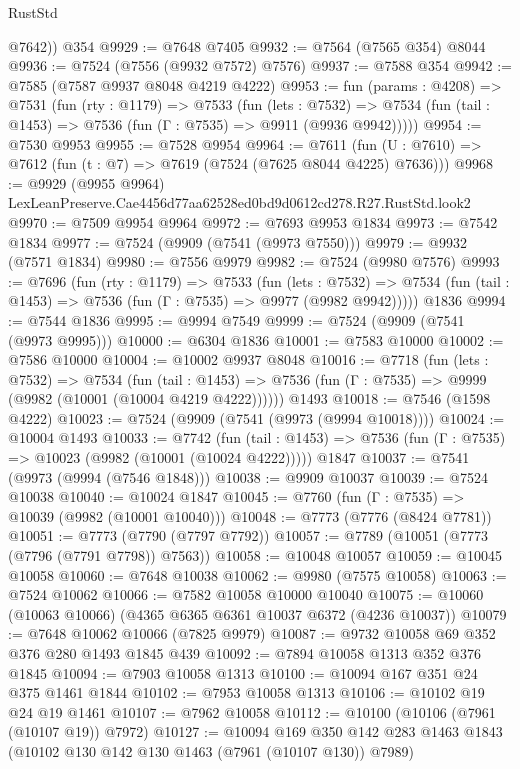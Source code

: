 \begin{lexlean}{RustStd}
\begin{coremodule}
        @7642))
    @354
@9929 := @7648 @7405
@9932 := @7564 (@7565 @354) @8044
@9936 := @7524 (@7556 (@9932 @7572) @7576)
@9937 := @7588 @354
@9942 := @7585 (@7587 @9937 @8048 @4219 @4222)
@9953 := fun (params : @4208) =>
  @7531
    (fun (rty : @1179) =>
    @7533
      (fun (lets : @7532) =>
      @7534 (fun (tail : @1453) => @7536 (fun (Γ : @7535) => @9911 (@9936 @9942)))))
@9954 := @7530 @9953
@9955 := @7528 @9954
@9964 := @7611 (fun (U : @7610) => @7612 (fun (t : @7) => @7619 (@7524 (@7625 @8044 @4225) @7636)))
@9968 := @9929 (@9955 @9964) LexLeanPreserve.Cae4456d77aa62528ed0bd9d0612cd278.R27.RustStd.look2
@9970 := @7509 @9954 @9964
@9972 := @7693 @9953 @1834
@9973 := @7542 @1834
@9977 := @7524 (@9909 (@7541 (@9973 @7550)))
@9979 := @9932 (@7571 @1834)
@9980 := @7556 @9979
@9982 := @7524 (@9980 @7576)
@9993 := @7696
    (fun (rty : @1179) =>
    @7533
      (fun (lets : @7532) =>
      @7534 (fun (tail : @1453) => @7536 (fun (Γ : @7535) => @9977 (@9982 @9942)))))
    @1836
@9994 := @7544 @1836
@9995 := @9994 @7549
@9999 := @7524 (@9909 (@7541 (@9973 @9995)))
@10000 := @6304 @1836
@10001 := @7583 @10000
@10002 := @7586 @10000
@10004 := @10002 @9937 @8048
@10016 := @7718
    (fun (lets : @7532) =>
    @7534
      (fun (tail : @1453) =>
      @7536 (fun (Γ : @7535) => @9999 (@9982 (@10001 (@10004 @4219 @4222))))))
    @1493
@10018 := @7546 (@1598 @4222)
@10023 := @7524 (@9909 (@7541 (@9973 (@9994 @10018))))
@10024 := @10004 @1493
@10033 := @7742
    (fun (tail : @1453) => @7536 (fun (Γ : @7535) => @10023 (@9982 (@10001 (@10024 @4222)))))
    @1847
@10037 := @7541 (@9973 (@9994 (@7546 @1848)))
@10038 := @9909 @10037
@10039 := @7524 @10038
@10040 := @10024 @1847
@10045 := @7760 (fun (Γ : @7535) => @10039 (@9982 (@10001 @10040)))
@10048 := @7773 (@7776 (@8424 @7781))
@10051 := @7773 (@7790 (@7797 @7792))
@10057 := @7789 (@10051 (@7773 (@7796 (@7791 @7798)) @7563))
@10058 := @10048 @10057
@10059 := @10045 @10058
@10060 := @7648 @10038
@10062 := @9980 (@7575 @10058)
@10063 := @7524 @10062
@10066 := @7582 @10058 @10000 @10040
@10075 := @10060 (@10063 @10066) (@4365 @6365 @6361 @10037 @6372 (@4236 @10037))
@10079 := @7648 @10062 @10066 (@7825 @9979)
@10087 := @9732 @10058 @69 @352 @376 @280 @1493 @1845 @439
@10092 := @7894 @10058 @1313 @352 @376 @1845
@10094 := @7903 @10058 @1313
@10100 := @10094 @167 @351 @24 @375 @1461 @1844
@10102 := @7953 @10058 @1313
@10106 := @10102 @19 @24 @19 @1461
@10107 := @7962 @10058
@10112 := @10100 (@10106 (@7961 (@10107 @19)) @7972)
@10127 := @10094
    @169
    @350
    @142
    @283
    @1463
    @1843
    (@10102 @130 @142 @130 @1463 (@7961 (@10107 @130)) @7989)

\end{coremodule}
\end{lexlean}
